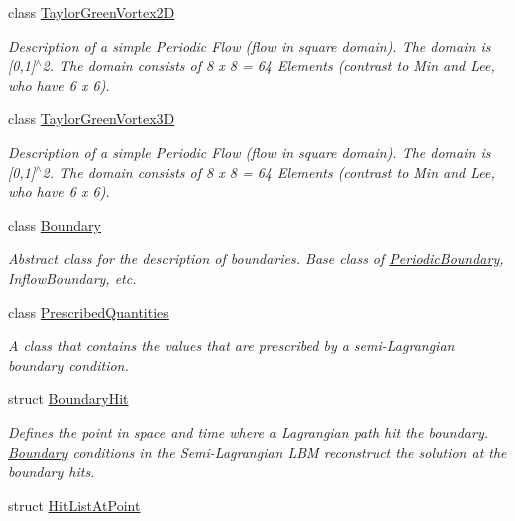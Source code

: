 \begin{DoxyCompactItemize}
\item 
class \hyperlink{classnatrium_1_1TaylorGreenVortex2D}{TaylorGreenVortex2D}
\begin{DoxyCompactList}\small\item\em Description of a simple Periodic Flow (flow in square domain). The domain is \mbox{[}0,1\mbox{]}$^\wedge$2. The domain consists of 8 x 8 = 64 Elements (contrast to Min and Lee, who have 6 x 6). \item\end{DoxyCompactList}\item 
class \hyperlink{classnatrium_1_1TaylorGreenVortex3D}{TaylorGreenVortex3D}
\begin{DoxyCompactList}\small\item\em Description of a simple Periodic Flow (flow in square domain). The domain is \mbox{[}0,1\mbox{]}$^\wedge$2. The domain consists of 8 x 8 = 64 Elements (contrast to Min and Lee, who have 6 x 6). \item\end{DoxyCompactList}\item 
class \hyperlink{classnatrium_1_1Boundary}{Boundary}
\begin{DoxyCompactList}\small\item\em Abstract class for the description of boundaries. Base class of \hyperlink{classnatrium_1_1PeriodicBoundary}{PeriodicBoundary}, InflowBoundary, etc. \item\end{DoxyCompactList}\item 
class \hyperlink{classnatrium_1_1PrescribedQuantities}{PrescribedQuantities}
\begin{DoxyCompactList}\small\item\em A class that contains the values that are prescribed by a semi-\/Lagrangian boundary condition. \item\end{DoxyCompactList}\item 
struct \hyperlink{structnatrium_1_1BoundaryHit}{BoundaryHit}
\begin{DoxyCompactList}\small\item\em Defines the point in space and time where a Lagrangian path hit the boundary. \hyperlink{classnatrium_1_1Boundary}{Boundary} conditions in the Semi-\/Lagrangian LBM reconstruct the solution at the boundary hits. \item\end{DoxyCompactList}\item 
struct \hyperlink{structnatrium_1_1HitListAtPoint}{HitListAtPoint}

\end{DoxyCompactItemize}
